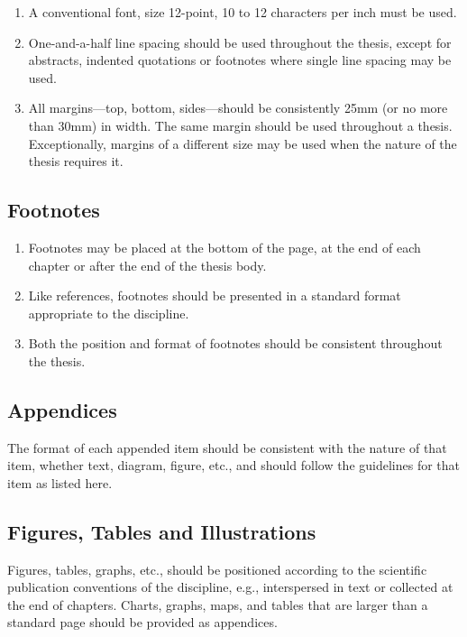 \begin{enumerate}
  \item A conventional font, size 12-point, 10 to 12 characters per inch must be used.
  \item One-and-a-half line spacing should be used throughout the thesis, except for abstracts, indented quotations or footnotes where single line spacing may be used.
  \item All margins—top, bottom, sides—should be consistently 25mm (or no more than 30mm) in width. The same margin should be used throughout a thesis. Exceptionally, margins of a different size may be used when the nature of the thesis requires it.
\end{enumerate}

\subsection{Footnotes}

\begin{enumerate}
  \item Footnotes may be placed at the bottom of the page, at the end of each chapter or after the end of the thesis body.
  \item Like references, footnotes should be presented in a standard format appropriate to the discipline.
  \item Both the position and format of footnotes should be consistent throughout the thesis.
\end{enumerate}

\subsection{Appendices}

The format of each appended item should be consistent with the nature of that item, whether text, diagram, figure, etc., and should follow the guidelines for that item as listed here.

\subsection{Figures, Tables and Illustrations}

Figures, tables, graphs, etc., should be positioned according to the scientific publication conventions of the discipline, e.g., interspersed in text or collected at the end of chapters. Charts, graphs, maps, and tables that are larger than a standard page should be provided as appendices.


